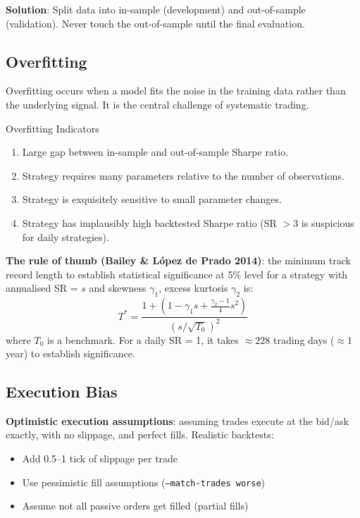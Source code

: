 \documentclass[12pt,a4paper,openany]{report}
\theoremstyle{definition}
\begin{document}
\textbf{Solution}: Split data into in-sample (development) and out-of-sample (validation). Never touch the out-of-sample until the final evaluation.

\subsection{Overfitting}

Overfitting occurs when a model fits the noise in the training data rather than the underlying signal. It is the central challenge of systematic trading.

\begin{keyconceptbox}{Overfitting Indicators}
\begin{enumerate}[label=\arabic*.]
  \item Large gap between in-sample and out-of-sample Sharpe ratio.
  \item Strategy requires many parameters relative to the number of observations.
  \item Strategy is exquisitely sensitive to small parameter changes.
  \item Strategy has implausibly high backtested Sharpe ratio (SR $> 3$ is suspicious for daily strategies).
\end{enumerate}
\end{keyconceptbox}

\textbf{The rule of thumb (Bailey \& L\'{o}pez de Prado 2014)}: the minimum track record length to establish statistical significance at 5\% level for a strategy with annualised SR = $s$ and skewness $\gamma_1$, excess kurtosis $\gamma_2$ is:
\begin{equation}
  T^* = \frac{1 + (1 - \gamma_1 s + \frac{\gamma_2 - 1}{4}s^2)}{(s/\sqrt{T_0})^2}
\end{equation}
where $T_0$ is a benchmark. For a daily SR = 1, it takes $\approx 228$ trading days ($\approx 1$ year) to establish significance.

\subsection{Execution Bias}

\textbf{Optimistic execution assumptions}: assuming trades execute at the bid/ask exactly, with no slippage, and perfect fills. Realistic backtests:
\begin{itemize}
  \item Add 0.5--1 tick of slippage per trade
  \item Use pessimistic fill assumptions (\texttt{--match-trades worse})
  \item Assume not all passive orders get filled (partial fills)
\end{itemize}
\end{document}
